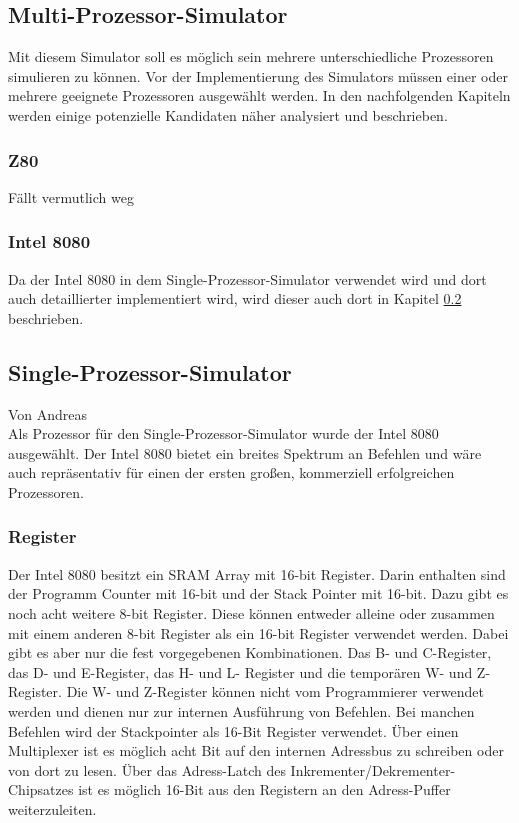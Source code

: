 \documentclass[12pt]{article}
\begin{document}
\newpage

\subsection{Multi-Prozessor-Simulator}
Mit diesem Simulator soll es möglich sein mehrere unterschiedliche Prozessoren simulieren zu können. Vor der Implementierung des Simulators müssen einer oder mehrere geeignete Prozessoren ausgewählt werden. In den nachfolgenden Kapiteln werden einige potenzielle Kandidaten näher analysiert und beschrieben.

\subsubsection{Z80}
Fällt vermutlich weg

\subsubsection{Intel 8080}
Da der Intel 8080 in dem Single-Prozessor-Simulator verwendet wird und dort auch detaillierter implementiert wird, wird dieser auch dort in Kapitel \ref{SPS} beschrieben.


\newpage

\subsection{Single-Prozessor-Simulator}
\label{SPS} 
Von Andreas\\ 

\noindent
Als Prozessor für den Single-Prozessor-Simulator wurde der Intel 8080 ausgewählt. Der Intel 8080 bietet ein breites Spektrum an Befehlen und wäre auch repräsentativ für einen der ersten großen, kommerziell erfolgreichen Prozessoren. 

\subsubsection{Register}
\label{RegisterSection}

Der Intel 8080 besitzt ein SRAM Array mit 16-bit Register. Darin enthalten sind der Programm Counter mit 16-bit und der Stack Pointer mit 16-bit. Dazu gibt es noch acht weitere 8-bit Register. Diese können entweder alleine oder zusammen mit einem anderen 8-bit Register als ein 16-bit Register verwendet werden. Dabei gibt es aber nur die fest vorgegebenen Kombinationen. Das B- und C-Register, das D- und E-Register, das H- und L- Register und die temporären W- und Z- Register. Die W- und Z-Register können nicht vom Programmierer verwendet werden und dienen nur zur internen Ausführung von Befehlen. Bei manchen Befehlen wird der Stackpointer als 16-Bit Register verwendet.
Über einen Multiplexer ist es möglich acht Bit auf den internen Adressbus zu schreiben oder von dort zu lesen. Über das Adress-Latch des Inkrementer/Dekrementer-Chipsatzes ist es möglich 16-Bit aus den Registern an den Adress-Puffer weiterzuleiten. \cite{IntMan16}
\end{document}
